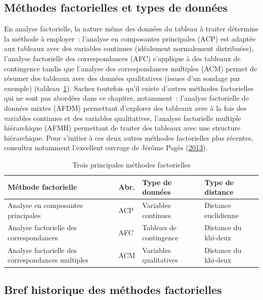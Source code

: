 \documentclass[
  11pt,
  french,
]{book}
\begin{document}
\hypertarget{sect1211}{%
\subsection{Méthodes factorielles et types de données}\label{sect1211}}

En analyse factorielle, la nature même des données du tableau à traiter détermine la méthode à employer~: l'analyse en composantes principales (ACP) est adaptée aux tableaux avec des variables continues (idéalement normalement distribuées), l'analyse factorielle des correspondances (AFC) s'applique à des tableaux de contingence tandis que l'analyse des correspondances multiples (ACM) permet de résumer des tableaux avec des données qualitatives (issues d'un sondage par exemple) (tableau~\ref{tab:typesanalysesfactorielles}). Sachez toutefois qu'il existe d'autres méthodes factorielles qui ne sont pas abordées dans ce chapitre, notamment~: l'analyse factorielle de données mixtes (AFDM) permettant d'explorer des tableaux avec à la fois des variables continues et des variables qualitatives, l'analyse factorielle multiple hiérarchique (AFMH) permettant de traiter des tableaux avec une structure hiérarchique. Pour s'initier à ces deux autres méthodes factorielles plus récentes, consultez notamment l'excellent ouvrage de Jérôme Pagès (\protect\hyperlink{ref-pages2013analyse}{2013}).

\begin{table}

\caption{\label{tab:typesanalysesfactorielles}Trois principales méthodes factorielles}
\centering
\fontsize{8}{10}\selectfont
\begin{tabular}[t]{llll}
\toprule
Méthode factorielle & Abr. & Type de données & Type de distance\\
\midrule
Analyse en composantes principales & ACP & Variables continues & Distance euclidienne\\
Analyse factorielle des correspondances & AFC & Tableau de contingence & Distance du khi-deux\\
Analyse factorielle des correspondances multiples & ACM & Variables qualitatives & Distance du khi-deux\\
\bottomrule
\end{tabular}
\end{table}

\hypertarget{sect1212}{%
\subsection{Bref historique des méthodes factorielles}\label{sect1212}}
\end{document}
